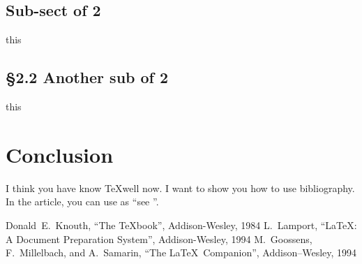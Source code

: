  \subsection{Sub-sect of 2}              %
 this                                    %
 \subsection*{\S 2.2 Another sub of 2}   %
 this                                    %
 \section{Conclusion}                    %
 I think you have know \TeX well now.    %
 I want to show you how to use           %
 bibliography. In the article, you       %
 can use as ``see \cite{texbook}''.      %
 \begin{thebibliography}{0}


  Donald~E.~Knouth, ``The \TeX book'',
 Addison-Wesley, 1984
  L.\ Lamport, ``\LaTeX:
         A Document Preparation System'',
         Addison-Wesley, 1994
  M.~Goossens, F.~Millelbach,
         and A.~Samarin, ``The \LaTeX\ Companion'',
         Addison--Wesley, 1994
 \end{thebibliography}

  